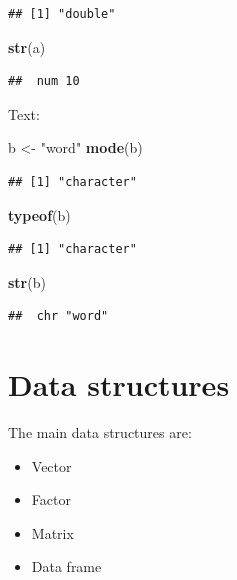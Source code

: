 \documentclass[]{book}
\newenvironment{Shaded}{\begin{snugshade}}{\end{snugshade}}
\newcommand{\KeywordTok}[1]{\textcolor[rgb]{0.13,0.29,0.53}{\textbf{#1}}}
\newcommand{\NormalTok}[1]{#1}
\newcommand{\StringTok}[1]{\textcolor[rgb]{0.31,0.60,0.02}{#1}}
\providecommand{\tightlist}{%
  \setlength{\itemsep}{0pt}\setlength{\parskip}{0pt}}
\begin{document}
\begin{verbatim}
## [1] "double"
\end{verbatim}

\begin{Shaded}
\begin{Highlighting}[]
\KeywordTok{str}\NormalTok{(a)}
\end{Highlighting}
\end{Shaded}

\begin{verbatim}
##  num 10
\end{verbatim}

Text:

\begin{Shaded}
\begin{Highlighting}[]
\NormalTok{b <-}\StringTok{ "word"}
\KeywordTok{mode}\NormalTok{(b)}
\end{Highlighting}
\end{Shaded}

\begin{verbatim}
## [1] "character"
\end{verbatim}

\begin{Shaded}
\begin{Highlighting}[]
\KeywordTok{typeof}\NormalTok{(b)}
\end{Highlighting}
\end{Shaded}

\begin{verbatim}
## [1] "character"
\end{verbatim}

\begin{Shaded}
\begin{Highlighting}[]
\KeywordTok{str}\NormalTok{(b)}
\end{Highlighting}
\end{Shaded}

\begin{verbatim}
##  chr "word"
\end{verbatim}

\hypertarget{data-structures}{%
\chapter{Data structures}\label{data-structures}}

The main data structures are:

\begin{itemize}
\tightlist
\item
  Vector
\item
  Factor
\item
  Matrix
\item
  Data frame
\end{itemize}
\end{document}
